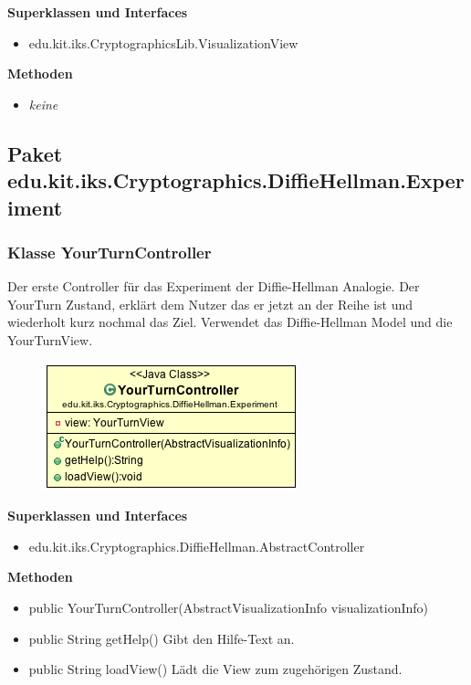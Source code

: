 \documentclass{article}
\begin{document}
      \textbf{Superklassen und Interfaces}
      \begin{itemize}
        \item edu.kit.iks.CryptographicsLib.VisualizationView
      \end{itemize}

      \textbf{Methoden}
      \begin{itemize}
        \item \textit{keine}
      \end{itemize}

\subsection{Paket edu.kit.iks.Cryptographics.DiffieHellman.Experiment}

\subsubsection{Klasse YourTurnController}
      Der erste Controller für das Experiment der Diffie-Hellman Analogie.
      Der YourTurn Zustand, erklärt dem Nutzer das er jetzt an der Reihe ist
      und wiederholt kurz nochmal das Ziel.
      Verwendet das Diffie-Hellman Model und die YourTurnView.

      \begin{figure}[H]
        \centering
        \includegraphics{resources/edu-kit-iks-Cryptographics-DiffieHellman-Experiment-YourTurnController}
      \end{figure}

      \textbf{Superklassen und Interfaces}
      \begin{itemize}
        \item edu.kit.iks.Cryptographics.DiffieHellman.AbstractController
      \end{itemize}

      \textbf{Methoden}
      \begin{itemize}
          \item public YourTurnController(AbstractVisualizationInfo visualizationInfo)
        \item public String getHelp() \newline
        Gibt den Hilfe-Text an.
        \item public String loadView() \newline
        Lädt die View zum zugehörigen Zustand.
      \end{itemize}
\end{document}
